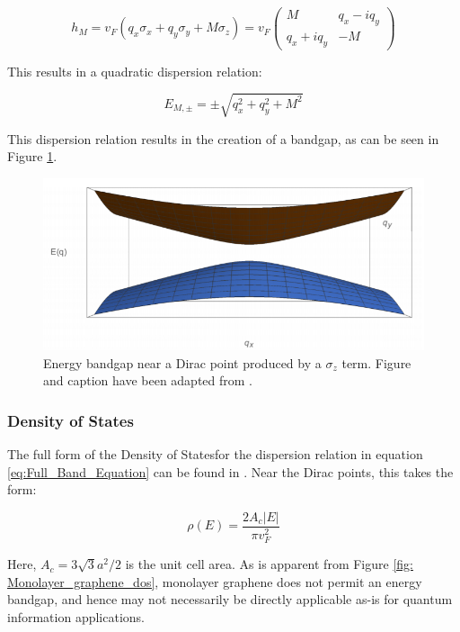 \documentclass[]{article}
\begin{document}
\begin{equation}
	h_M = v_F (q_x \sigma_x + q_y \sigma_y + M\sigma_z) = v_F \begin{pmatrix}
					M & q_x -iq_y\\
					q_x + i q_y & -M
					\end{pmatrix}
\end{equation} 

This results in a quadratic dispersion relation:

\begin{equation}
	E_{M, \pm} = \pm \sqrt{q_x^2 + q_y^2 + M^2}
\end{equation} 

This dispersion relation results in the creation of a bandgap, as can be seen in Figure \ref{fig: monolayer_bandgap}.

\begin{figure}[htb]
	\centering
	\includegraphics[scale = 0.7]{monolayer_bandgap.PNG}
	\caption{Energy bandgap near a Dirac point produced by a $\sigma_z$ term. Figure and caption have been adapted from \cite{graphene_tight_bonding}.}
	\label{fig: monolayer_bandgap}
\end{figure}


\subsubsection{Density of States}
The full form of the Density of States\footnotemark for the dispersion relation in equation \ref{eq:Full_Band_Equation} can be found in \cite{The_Electronic_Properties_of_Graphene}. Near the Dirac points, this takes the form:

\begin{equation}
	\rho(E) = \frac{2A_c |E|}{\pi v_F^2}
\end{equation}

Here, $A_c = 3\sqrt{3}a^2/2$ is the unit cell area. As is apparent from Figure \ref{fig: Monolayer_graphene_dos}, monolayer graphene does not permit an energy bandgap, and hence may not necessarily be directly applicable as-is for quantum information applications.
\end{document}
